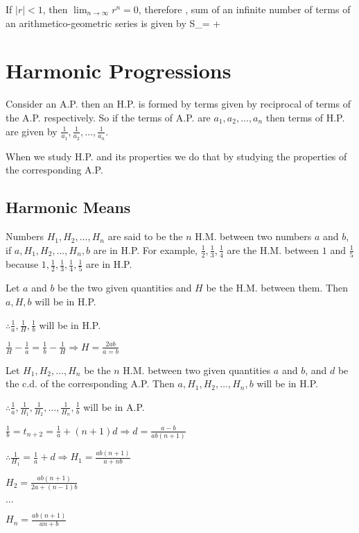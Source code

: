 If $|r|< 1$, then $\displaystyle\lim_{n\to \infty}r^n = 0$, therefore , sum of an infinite number of terms of an arithmetico-geometric series is
given by
\startformula S_\infty =  + \stopformula

\section{Harmonic Progressions}
Consider an A.P. then an H.P. is formed by terms given by reciprocal of terms of the A.P. respectively. So if the terms of A.P. are
$a_1, a_2, \ldots, a_n$ then terms of H.P. are given by $\frac{1}{a_1}, \frac{1}{a_2}, \ldots, \frac{1}{a_n}$.

When we study H.P. and its properties we do that by studying the properties of the corresponding A.P.

\subsection{Harmonic Means}
Numbers $H_1, H_2, \ldots, H_n$ are said to be the $n$ H.M. between two numbers $a$ and $b$, if $a, H_1, H_2, \ldots, H_n, b$ are
in H.P. For example, $\frac{1}{2}, \frac{1}{3}, \frac{1}{4}$ are the H.M. between $1$ and $\frac{1}{5}$ because $1, \frac{1}{2},
\frac{1}{3}, \frac{1}{4}, \frac{1}{5}$ are in H.P.

Let $a$ and $b$ be the two given quantities and $H$ be the H.M. between them. Then $a, H, b$ will be in H.P.

$\therefore \frac{1}{a}, \frac{1}{H}, \frac{1}{b}$ will be in H.P.

$\frac{1}{H} - \frac{1}{a} = \frac{1}{b} - \frac{1}{H} \Rightarrow H = \frac{2ab}{a =b}$

Let $H_1, H_2, \ldots, H_n$ be the $n$ H.M. between two given quantities $a$ and $b$, and $d$ be the c.d. of the corresponding A.P.
Then $a, H_1, H_2, \ldots, H_n, b$ will be in H.P.

$\therefore \frac{1}{a}, \frac{1}{H_1}, \frac{1}{H_2}, \ldots, \frac{1}{H_n}, \frac{1}{b}$ will be in A.P.

$\frac{1}{b} = t_{n + 2} = \frac{1}{a} + (n + 1)d \Rightarrow d = \frac{a - b}{ab(n + 1)}$

$\therefore \frac{1}{H_1} = \frac{1}{a} + d \Rightarrow H_1 = \frac{ab(n + 1)}{a + nb}$

$H_2 = \frac{ab(n + 1)}{2a + (n - 1)b}$

$\ldots$

$H_n = \frac{ab(n + 1)}{an + b}$

